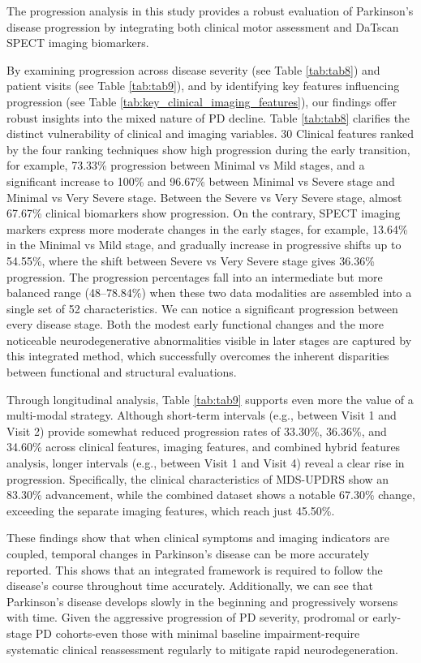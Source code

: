 \documentclass[twocolumn]{article}
\begin{document}
The progression analysis in this study provides a robust evaluation of Parkinson's disease progression by integrating both clinical motor assessment and DaTscan SPECT imaging biomarkers.

By examining progression across disease severity (see Table \ref{tab:tab8}) and patient visits (see Table \ref{tab:tab9}), and by identifying key features influencing progression (see Table \ref{tab:key_clinical_imaging_features}), our findings offer robust insights into the mixed nature of PD decline.
Table \ref{tab:tab8} clarifies the distinct vulnerability of clinical and imaging variables. 30 Clinical features ranked by the four ranking techniques show high progression during the early transition, for example, 73.33\% progression between Minimal vs Mild stages, and a significant increase to 100\% and 96.67\% between Minimal vs Severe stage and Minimal vs Very Severe stage. Between the Severe vs Very Severe stage, almost 67.67\% clinical biomarkers show progression. On the contrary, SPECT imaging markers express more moderate changes in the early stages, for example, 13.64\% in the Minimal vs Mild stage, and gradually increase in progressive shifts up to 54.55\%, where the shift between Severe vs Very Severe stage gives 36.36\% progression. The progression percentages fall into an intermediate but more balanced range (48–78.84\%) when these two data modalities are assembled into a single set of 52 characteristics. We can notice a significant progression between every disease stage. Both the modest early functional changes and the more noticeable neurodegenerative abnormalities visible in later stages are captured by this integrated method, which successfully overcomes the inherent disparities between functional and structural evaluations.

Through longitudinal analysis, Table \ref{tab:tab9} supports even more the value of a multi-modal strategy. Although short-term intervals (e.g., between Visit 1 and Visit 2) provide somewhat reduced progression rates of 33.30\%, 36.36\%, and 34.60\% across clinical features, imaging features, and combined hybrid features analysis, longer intervals (e.g., between Visit 1 and Visit 4) reveal a clear rise in progression. Specifically, the clinical characteristics of MDS-UPDRS show an 83.30\% advancement, while the combined dataset shows a notable 67.30\% change, exceeding the separate imaging features, which reach just 45.50\%. 

These findings show that when clinical symptoms and imaging indicators are coupled, temporal changes in Parkinson's disease can be more accurately reported. This shows that an integrated framework is required to follow the disease's course throughout time accurately. Additionally, we can see that Parkinson's disease develops slowly in the beginning and progressively worsens with time. Given the aggressive progression of PD severity, prodromal or early-stage PD cohorts-even those with minimal baseline impairment-require systematic clinical reassessment regularly to mitigate rapid neurodegeneration.
\end{document}
